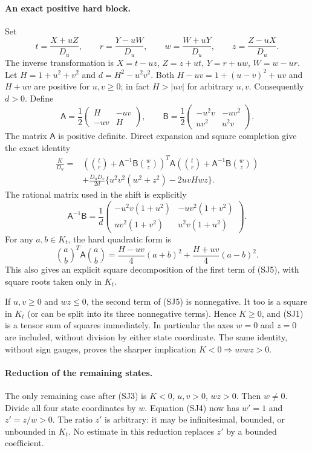 \paragraph{An exact positive hard block.}
Set
\[
 t=\frac{X+uZ}{D_u},\qquad r=\frac{Y-uW}{D_u},\qquad
 w=\frac{W+uY}{D_u},\qquad z=\frac{Z-uX}{D_u}.             \tag{SJ4}
\]
The inverse transformation is
$X=t-uz$, $Z=z+ut$, $Y=r+uw$, $W=w-ur$.
Let $H=1+u^2+v^2$ and $d=H^2-u^2v^2$.  Both
$H-uv=1+(u-v)^2+uv$ and $H+uv$ are positive for $u,v\geq0$;
in fact $H>|uv|$ for arbitrary $u,v$.  Consequently $d>0$.
Define
\[
 \mathsf A=\frac12\begin{pmatrix}H&-uv\\-uv&H\end{pmatrix},\qquad
 \mathsf B=\frac12\begin{pmatrix}-u^2v&-uv^2\\uv^2&u^2v\end{pmatrix}.
\]
The matrix $\mathsf A$ is positive definite.  Direct expansion and square
completion give the exact identity
\begin{align}
 \frac K{D_u}
 ={}&\left(\binom tr+\mathsf A^{-1}\mathsf B\binom wz\right)^{\!T}
       \mathsf A
       \left(\binom tr+\mathsf A^{-1}\mathsf B\binom wz\right)\\
    &+\frac{D_uD_v}{2d}
       \{u^2v^2(w^2+z^2)-2uvH wz\}.                    \tag{SJ5}
\end{align}
The rational matrix used in the shift is explicitly
\[
 \mathsf A^{-1}\mathsf B=
 \frac1d\begin{pmatrix}
 -u^2v(1+u^2)&-uv^2(1+v^2)\\
 uv^2(1+v^2)&u^2v(1+u^2)
 \end{pmatrix}.                                         \tag{SJ6}
\]
For any $a,b\in K_t$, the hard quadratic form is
\[
 \binom{a}{b}^{\!T}\mathsf A\binom{a}{b}
   =\frac{H-uv}{4}(a+b)^2+\frac{H+uv}{4}(a-b)^2.         \tag{SJ7}
\]
This also gives an explicit square decomposition of the first term of
(SJ5), with square roots taken only in $K_t$.

If $u,v\geq0$ and $wz\leq0$, the second term of (SJ5) is nonnegative.
It too is a square in $K_t$ (or can be split into its three nonnegative
terms).  Hence $K\geq0$, and (SJ1) is a tensor sum of squares immediately.
In particular the axes $w=0$ and $z=0$ are included, without division by
either state coordinate.  The same identity, without sign gauges, proves
the sharper implication $K<0\Longrightarrow uvwz>0$.

\paragraph{Reduction of the remaining states.}
The only remaining case after (SJ3) is $K<0$, $u,v>0$, $wz>0$.
Then $w\ne0$.  Divide all four state coordinates by $w$.  Equation (SJ4)
now has $w'=1$ and $z'=z/w>0$.  The ratio $z'$ is arbitrary: it may be
infinitesimal, bounded, or unbounded in $K_t$.  No estimate in this
reduction replaces $z'$ by a bounded coefficient.

